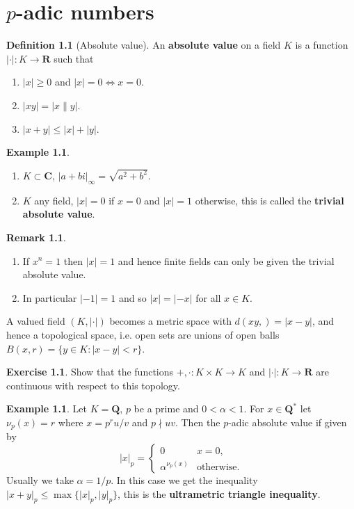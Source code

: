 \documentclass[10pt,]{book}
\newcommand{\lt}{<}
\newcommand{\terminology}[1]{\textbf{#1}}
\theoremstyle{plain}
\theoremstyle{definition}
\newtheorem{definition}[theorem]{Definition}
\newtheorem{example}[theorem]{Example}
\newtheorem{exercise}[theorem]{Exercise}
\newtheorem{remark}[theorem]{Remark}
\newcommand{\CC}{\mathbf{C}}
\newcommand{\QQ}{\mathbf{Q}}
\newcommand{\RR}{\mathbf{R}}
\newcommand{\ab}{|\cdot|}
\begin{document}
\chapter[\(p\)-adic numbers]{\(p\)-adic numbers}\label{chap-padic}
\begin{definition}[Absolute value]\label{definition-1}
An \terminology{absolute value} on a field \(K\) is a function \(\ab\colon K \to \RR\) such that
          \begin{enumerate}
\item{}\(|x|\ge 0\) and \(|x| = 0 \iff x = 0\).\item{}\(|xy| = |x\|y|\).\item{}\(|x + y| \le |x| + |y|\).\end{enumerate}
\end{definition}
\begin{example}\label{example-1}
\begin{enumerate}
\item{}\(K \subset \CC\), \(|a+bi|_{\infty} = \sqrt{a^2 + b^2}\).\item{}\(K\) any field, \(|x| = 0\) if \(x = 0\) and \(|x| = 1\) otherwise, this is called the \terminology{trivial absolute value}.\end{enumerate}
\end{example}
\begin{remark}\label{remark-1}
\begin{enumerate}
\item{}If \(x^n = 1\) then \(|x|  = 1\) and hence finite fields can only be given the trivial absolute value.\item{}In particular \(| -1| = 1\) and so \(|x| = |-x|\) for all \(x \in K\).\end{enumerate}
\end{remark}
A valued field \((K, \ab)\) becomes a metric space with \(d(xy,) = |x-y|\), and hence a topological space, i.e. open sets are unions of open balls \(B(x,r) = \{y\in K : |x-y| \lt r\}\).%
\begin{exercise}\label{exercise-1}
Show that the functions \(+,\cdot \colon K\times K \to K\) and \(\ab\colon K \to \RR\) are continuous with respect to this topology.\end{exercise}
\begin{example}\label{example-2}
Let \(K = \QQ,\, p\) be a prime and \(0 \lt \alpha \lt 1\).
          For \(x\in \QQ^*\) let \(\nu_p(x) = r\) where \(x = p^r u/ v\) and \(p\nmid uv\).
          Then the \(p\)-adic absolute value if given by \[|x|_p = \begin{cases} 0 & x = 0,\\ \alpha^{\nu_p(x)} & \text{otherwise}.\end{cases}\]
          Usually we take \(\alpha = 1/p\).
          In this case we get the inequality \(|x+ y|_p \le \max\{|x|_p, |y|_p\}\), this is the \terminology{ultrametric triangle inequality}.
        \end{example}
\end{document}
